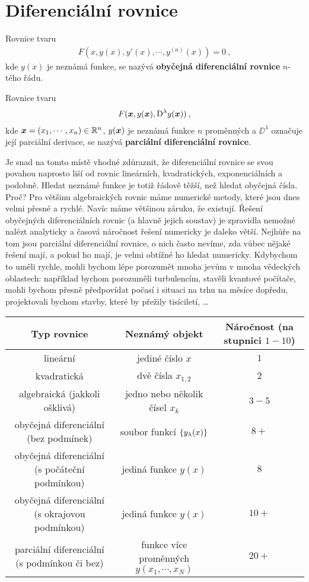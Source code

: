 \section{Diferenciální rovnice}

Rovnice tvaru \begin{align}
    F(x,y(x),y'(x),\cdots, y^{(n)}(x)) = 0 \:,
\end{align}
kde $y(x)$ je neznámá funkce, se nazývá \textbf{obyčejná diferenciální rovnice} $n$-tého řádu.

Rovnice tvaru \begin{align}
    F(\boldsymbol{x}, y(\boldsymbol{x}), \mathrm{D}^\lambda y(\boldsymbol{x})) \:,
\end{align}
kde $\boldsymbol{x} = (x_1, \cdots, x_n) \in \mathbb{R}^n$, $y(\boldsymbol{x})$ je neznámá funkce $n$ proměnných a $\DD^\lambda$ označuje její parciální derivace, se nazývá \textbf{parciální diferenciální rovnice}.


Je snad na tomto místě vhodné zdůraznit, že diferenciální rovnice se svou povahou naprosto liší od rovnic lineárních, kvadratických, exponenciálních a podobně. Hledat neznámé funkce je totiž řádově těžší, než hledat obyčejná čísla. Proč? Pro většinu algebraických rovnic máme numerické metody, které jsou dnes velmi přesné a rychlé. Navíc máme většinou záruku, že existují. Řešení obyčejných diferenciálních rovnic (a hlavně jejich soustav) je zpravidla nemožné nalézt analyticky a časová náročnost řešení numericky je daleko větší. Nejhůře na tom jsou parciální diferenciální rovnice, o nich často nevíme, zda vůbec nějaké řešení mají, a pokud ho mají, je velmi obtížné ho hledat numericky. Kdybychom to uměli rychle, mohli bychom lépe porozumět mnoha jevům v mnoha vědeckých oblastech: například bychom porozuměli turbulencím, stavěli kvantové počítače, mohli bychom přesně předpovídat počasí i situaci na trhu na měsíce dopředu, projektovali bychom stavby, které by přežily tisíciletí, \dots

\begin{table}[H]
    \centering
    \begin{tabular}{c|c|c}
        \textbf{Typ rovnice} & \textbf{Neznámý objekt} & \textbf{Náročnost} (na stupnici $1-10$) \\
        \hline
        lineární & jediné číslo $x$ & $1$ \\
        kvadratická & dvě čísla $x_{1,2}$ & $2$ \\
        algebraická (jakkoli ošklivá) & jedno nebo několik čísel $x_k$ & $3-5$ \\
        \hline
        obyčejná diferenciální (bez podmínek) & soubor funkcí $\left \lbrace y_\lambda(x) \right \rbrace$ & $8+$ \\
        obyčejná diferenciální (s počáteční podmínkou) & jediná funkce $y(x)$ & $8$ \\
        obyčejná diferenciální (s okrajovou podmínkou) & jediná funkce $y(x)$ & $10+$ \\
        \hline
        parciální diferenciální (s podmínkou či bez) & funkce více proměnných $y(x_1, \cdots, x_N)$ & $20+$
    \end{tabular}
\end{table}

